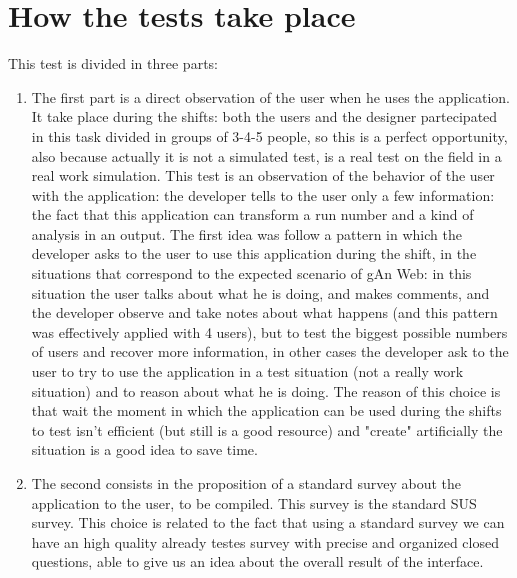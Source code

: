 \section{How the tests take place} 

This test is divided in three parts: 
\begin{enumerate}
\item
The first part is a direct observation of the user when he uses the application. It take place during the shifts: both the users and the designer partecipated in this task divided in groups of 3-4-5 people, so this is a perfect opportunity, also because actually it is not a simulated test, is a real test on the field in a real work simulation. This test is an observation of the behavior of the user with the application: the developer tells to the user only a few information: the fact that this application can transform a run number and a kind of analysis in an output. 
The first idea was follow a pattern in which the developer asks to the user to use this application during the shift, in the situations that correspond to the expected scenario of gAn Web: in this situation the user talks about what he is doing, and makes comments, and the developer observe and take notes about what happens (and this pattern was effectively applied with 4 users), but to test the biggest possible numbers of users and recover more information, in other cases the developer ask to the user to try to use the application in a test situation (not a really work situation) and to reason about what he is doing. The reason of this choice is that wait the moment in which the application can be used during the shifts to test isn't efficient (but still is a good resource) and "create" artificially the situation is a good idea to save time.

\item
The second consists in the proposition of a standard survey about the application to the user, to be compiled. This survey is the standard SUS survey. This choice is related to the fact that using a standard survey we can have an high quality already testes survey with precise and organized closed questions, able to give us an idea about the overall result of the interface. 


\end{enumerate}
